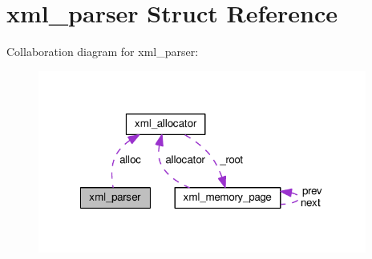 \hypertarget{structxml__parser}{\section{xml\+\_\+parser Struct Reference}
\label{structxml__parser}
}


Collaboration diagram for xml\+\_\+parser\+:
\nopagebreak
\begin{figure}[H]
\begin{center}
\leavevmode
\includegraphics[width=306pt]{structxml__parser__coll__graph}
\end{center}
\end{figure}
